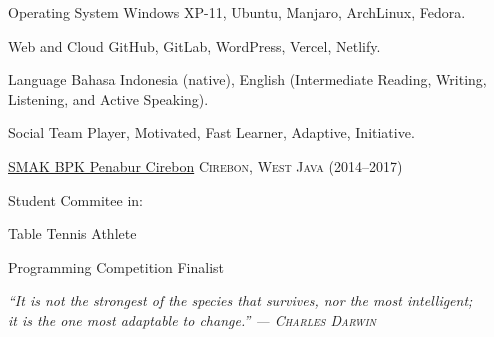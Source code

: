 \documentclass[11pt,a4paper]{article} %
\begin{document}
\headedsection
{Operating System}{} {
    \headedsubsection %
    {Windows XP-11, Ubuntu, Manjaro, ArchLinux, Fedora.}{}{}
}

\headedsection
{Web and Cloud}{} {
    \headedsubsection %
    {GitHub, GitLab, WordPress, Vercel, Netlify.}{}{}
}

\headedsection
{Language}{} {
    \headedsubsection %
    {Bahasa Indonesia (native), English (Intermediate Reading, Writing, Listening, and Active Speaking).}{}{}
}

\headedsection
{Social}{} {
    \headedsubsection %
    {Team Player, Motivated, Fast Learner, Adaptive, Initiative.}{}{}
}



\headedsection %
{\href{}{SMAK BPK Penabur Cirebon}}
{\dotfill\textsc{Cirebon, West Java (2014--2017)}} {

    \headedsubsection %
    { Student Commitee in: }
    {}
    {}

    \headedsubsection %
    { Table Tennis Athlete}
    {~}
    {}

    \headedsubsection %
    { Programming Competition Finalist}
    {~}
    {}
}

\vfill

\begin{flushright}
    \textit{
        ``It is not the strongest of the species that survives, nor the most intelligent;\\it is the one most adaptable to change.'' — \textsc{Charles Darwin}}
\end{flushright}

\vfill
\vfill
\end{document}
